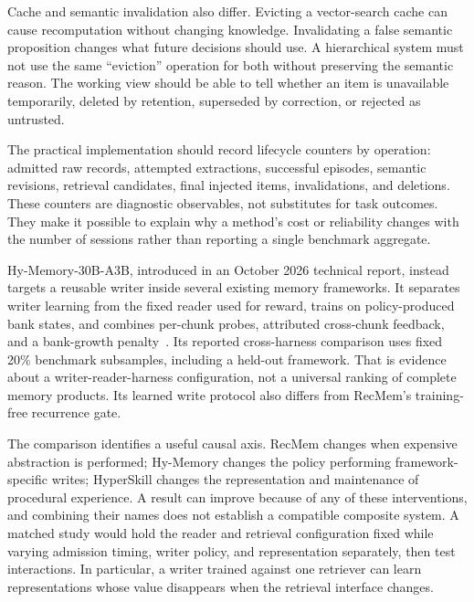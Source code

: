 Cache and semantic invalidation also differ. Evicting a vector-search cache can cause recomputation without changing knowledge. Invalidating a false semantic proposition changes what future decisions should use. A hierarchical system must not use the same ``eviction'' operation for both without preserving the semantic reason. The working view should be able to tell whether an item is unavailable temporarily, deleted by retention, superseded by correction, or rejected as untrusted.

The practical implementation should record lifecycle counters by operation: admitted raw records, attempted extractions, successful episodes, semantic revisions, retrieval candidates, final injected items, invalidations, and deletions. These counters are diagnostic observables, not substitutes for task outcomes. They make it possible to explain why a method's cost or reliability changes with the number of sessions rather than reporting a single benchmark aggregate.

Hy-Memory-30B-A3B, introduced in an October 2026 technical report, instead targets a reusable writer inside several existing memory frameworks. It separates writer learning from the fixed reader used for reward, trains on policy-produced bank states, and combines per-chunk probes, attributed cross-chunk feedback, and a bank-growth penalty~\cite{fei2026hymemory}. Its reported cross-harness comparison uses fixed 20\% benchmark subsamples, including a held-out framework. That is evidence about a writer-reader-harness configuration, not a universal ranking of complete memory products. Its learned write protocol also differs from RecMem's training-free recurrence gate.

The comparison identifies a useful causal axis. RecMem changes when expensive abstraction is performed; Hy-Memory changes the policy performing framework-specific writes; HyperSkill changes the representation and maintenance of procedural experience. A result can improve because of any of these interventions, and combining their names does not establish a compatible composite system. A matched study would hold the reader and retrieval configuration fixed while varying admission timing, writer policy, and representation separately, then test interactions. In particular, a writer trained against one retriever can learn representations whose value disappears when the retrieval interface changes.

